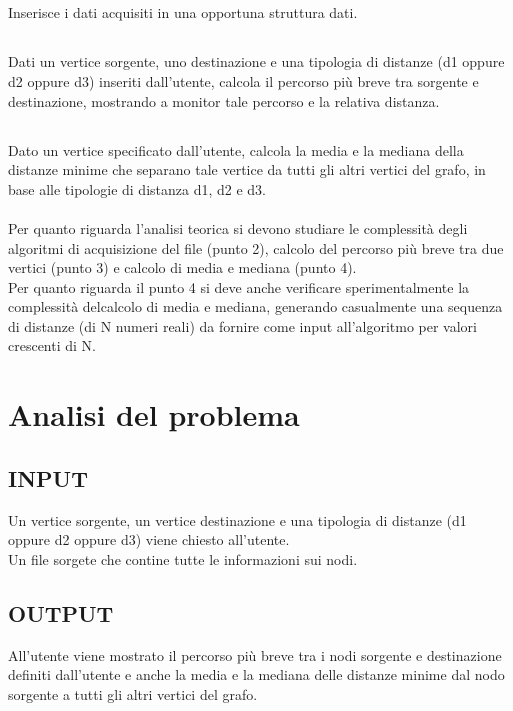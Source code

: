 \documentclass[11pt, a4paper, titlepage, block]{article}
\begin{document}
	\subsection{}
	Inserisce i dati acquisiti in una opportuna struttura dati.
	\subsection{}
	Dati un vertice sorgente, uno destinazione e una tipologia di distanze (d1 oppure d2 oppure d3) inseriti dall'utente, calcola il percorso pi\`{u} breve tra sorgente e destinazione, mostrando a
monitor tale percorso e la relativa distanza.
	\subsection{}
	Dato un vertice specificato dall'utente, calcola la media e la mediana della distanze minime che separano tale vertice da tutti gli altri vertici del grafo, in base alle tipologie di distanza d1, d2 e d3.\\ \\
	Per quanto riguarda l'analisi teorica si devono studiare le complessit\`{a} degli algoritmi di acquisizione del file (punto 2), calcolo del percorso pi\`{u} breve tra due vertici (punto 3) e calcolo di media e mediana (punto 4).\\
	Per quanto riguarda il punto 4 si deve anche verificare sperimentalmente la complessit\`{a} delcalcolo di media e mediana, generando casualmente una sequenza di distanze (di N numeri reali) da fornire come input all'algoritmo per valori crescenti di N.

	\newpage
\section{Analisi del problema}
	\subsection{INPUT}
		Un vertice sorgente, un vertice destinazione e una tipologia di distanze (d1 oppure d2 oppure d3) viene chiesto all'utente.\\
		Un file sorgete che contine tutte le informazioni sui nodi.\\
	\subsection{OUTPUT}
		All'utente viene mostrato il percorso pi\`{u} breve tra i nodi sorgente e destinazione definiti dall'utente e anche la media e la mediana delle distanze minime dal nodo sorgente a tutti gli altri vertici del grafo.\\
\end{document}

